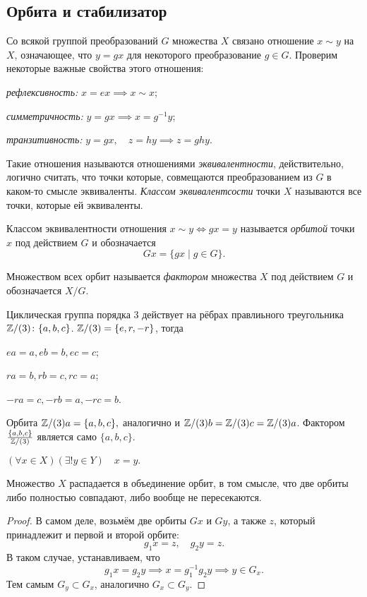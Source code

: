 \subsection{Орбита и стабилизатор}
Со всякой группой преобразований $G$ множества $X$ связано отношение $x \sim y$ на $X$, означающее, что $y = gx$ для некоторого преобразование $g \in G$. Проверим некоторые важные свойства этого отношения: \begin{conditions} \item \emph{рефлексивность:} $x = ex \implies x \sim x$;
    \item \emph{симметричность:} $y = gx \implies x = g^{-1}y$;
    \item \emph{транзитивность:} $y = gx,\quad z = hy \implies z = ghy$.
\end{conditions}

Такие отношения называются отношениями \emph{эквивалентности}, действительно, логично считать, что точки которые, совмещаются преобразованием из $G$ в каком-то смысле эквиваленты. \emph{Классом эквивалентсости} точки $X$ называются все точки, которые ей эквиваленты. 
\begin{definition}[Орбита]
    Классом эквивалентности отношения $x \sim y \iff gx = y$ называется \emph{орбитой} точки $x$ под действием $G$ и обозначается 
    \[Gx = \{gx \mid g \in G\}.\]

    Множеством всех орбит называется \emph{фактором} множества $X$ под действием $G$ и обозначается $X/G$.
\end{definition}

\begin{example}
    Циклическая группа порядка 3 действует на рёбрах правлиьного треугольника $\mathbb Z/(3)\colon \{a, b, c\}$. $\mathbb Z/(3) = \{e, r, -r\}$, тогда \begin{bullets}
    \item $ea = a, eb = b, ec = c$;
    \item $ra = b, rb = c, rc = a$;
    \item $-ra = c, -rb = a, -rc = b$.
    \end{bullets}

    Орбита $\mathbb Z/(3)a = \{a, b, c\}, $ аналогично и $\mathbb Z/(3)b = \mathbb Z/(3)c = \mathbb Z/(3)a$. Фактором $\frac{\{a, b, c\}}{\mathbb Z/(3)}$ является само $\{a, b, c\}$.

    $(\forall x \in X)(\exists! y \in Y) \quad x = y.$
\end{example}

\begin{proposition}
    Множество $X$ распадается в объединение орбит, в том смысле, что две орбиты либо полностью совпадают, либо вообще не пересекаются. 
\end{proposition}
\begin{proof}
    В самом деле, возьмём две орбиты $Gx$ и $Gy$, а также $z$, который принадлежит и первой и второй орбите: \[g_1x = z, \quad g_2y = z.\]
    В таком случае, устанавливаем, что $$g_1x = g_2y \implies x = g_1^{-1}g_2y \implies y \in G_x.$$
    Тем самым $G_y \subset G_x$, аналогично $G_x \subset G_y$.
\end{proof}

